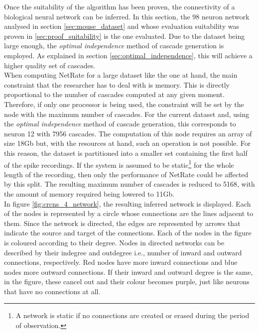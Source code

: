 Once the suitability of the algorithm has been proven, the connectivity of a biological neural network can be inferred. In this section, the 98 neuron network analysed in section \ref{sec:mouse_dataset} and whose evaluation suitability was proven in \ref{sec:proof_suitability} is the one evaluated. Due to the dataset being large enough, the \textit{optimal independence} method of cascade generation is employed. As explained in section \ref{sec:optimal_independence}, this will achieve a higher quality set of cascades.\\

When computing NetRate for a large dataset like the one at hand, the main constraint that the researcher has to deal with is memory. This is directly proportional to the number of cascades computed at any given moment. Therefore, if only one processor is being used, the constraint will be set by the node with the maximum number of cascades. For the current dataset and, using the \textit{optimal independence} method of cascade generation, this corresponds to neuron 12 with 7956 cascades. The computation of this node requires an array of size 18Gb but, with the resources at hand, such an operation is not possible. For this reason, the dataset is partitioned into a smaller set containing the first half of the spike recordings. If the system is assumed to be static\footnote{A network is static if no connections are created or erased during the period of observation.} for the whole length of the recording, then only the performance of NetRate could be affected by this split. The resulting maximum number of cascades is reduced to 5168, with the amount of memory required being lowered to 11Gb.\\

In figure \ref{fig:crcns_4_network}, the resulting inferred network is displayed. Each of the nodes is represented by a circle whose connections are the lines adjacent to them. Since the network is directed, the edges are represented by arrows that indicate the source and target of the connections. Each of the nodes in the figure is coloured according to their degree. Nodes in directed networks can be described by their indegree and outdegree i.e., number of inward and outward connections, respectively. Red nodes have more inward connections and blue nodes more outward connections. If their inward and outward degree is the same, in the figure, these cancel out and their colour becomes purple, just like neurons that have no connections at all. \\

